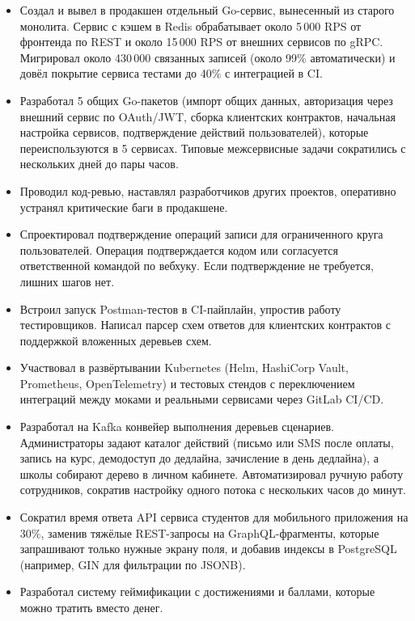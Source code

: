 \documentclass[10pt,a4paper]{article}
\begin{document}
\begin{itemize}
  \item Создал и вывел в продакшен отдельный Go-сервис, вынесенный из старого монолита. Сервис с кэшем в Redis обрабатывает около 5\,000 RPS от фронтенда по REST и около 15\,000 RPS от внешних сервисов по gRPC. Мигрировал около 430\,000 связанных записей (около 99\% автоматически) и довёл покрытие сервиса тестами до 40\% с интеграцией в CI.
  \item Разработал 5 общих Go-пакетов (импорт общих данных, авторизация через внешний сервис по OAuth/JWT, сборка клиентских контрактов, начальная настройка сервисов, подтверждение действий пользователей), которые переиспользуются в 5 сервисах. Типовые межсервисные задачи сократились с нескольких дней до пары часов.
  \item Проводил код-ревью, наставлял разработчиков других проектов, оперативно устранял критические баги в продакшене.
  \item Спроектировал подтверждение операций записи для ограниченного круга пользователей. Операция подтверждается кодом или согласуется ответственной командой по вебхуку. Если подтверждение не требуется, лишних шагов нет.
  \item Встроил запуск Postman-тестов в CI-пайплайн, упростив работу тестировщиков. Написал парсер схем ответов для клиентских контрактов с поддержкой вложенных деревьев схем.
  \item Участвовал в развёртывании Kubernetes (Helm, HashiCorp Vault, Prometheus, OpenTelemetry) и тестовых стендов с переключением интеграций между моками и реальными сервисами через GitLab CI/CD.
\end{itemize}

\begin{itemize}
  \item Разработал на Kafka конвейер выполнения деревьев сценариев. Администраторы задают каталог действий (письмо или SMS после оплаты, запись на курс, демодоступ до дедлайна, зачисление в день дедлайна), а школы собирают дерево в личном кабинете. Автоматизировал ручную работу сотрудников, сократив настройку одного потока с нескольких часов до минут.
  \item Сократил время ответа API сервиса студентов для мобильного приложения на 30\%, заменив тяжёлые REST-запросы на GraphQL-фрагменты, которые запрашивают только нужные экрану поля, и добавив индексы в PostgreSQL (например, GIN для фильтрации по JSONB).
  \item Разработал систему геймификации с достижениями и баллами, которые можно тратить вместо денег.
\end{itemize}
\end{document}
